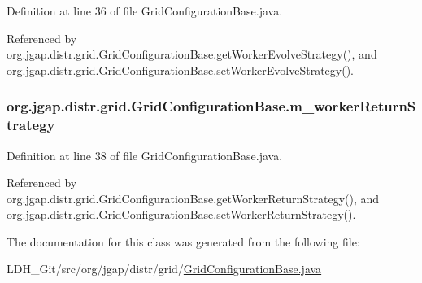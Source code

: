 Definition at line 36 of file Grid\-Configuration\-Base.\-java.



Referenced by org.\-jgap.\-distr.\-grid.\-Grid\-Configuration\-Base.\-get\-Worker\-Evolve\-Strategy(), and org.\-jgap.\-distr.\-grid.\-Grid\-Configuration\-Base.\-set\-Worker\-Evolve\-Strategy().

\hypertarget{classorg_1_1jgap_1_1distr_1_1grid_1_1_grid_configuration_base_aa5e69435385d2d6922c5dc43283f776e}{
\subsubsection[{m\-\_\-worker\-Return\-Strategy}]{ org.\-jgap.\-distr.\-grid.\-Grid\-Configuration\-Base.\-m\-\_\-worker\-Return\-Strategy\hspace{0.3cm}{\ttfamily [private]}}}\label{classorg_1_1jgap_1_1distr_1_1grid_1_1_grid_configuration_base_aa5e69435385d2d6922c5dc43283f776e}


Definition at line 38 of file Grid\-Configuration\-Base.\-java.



Referenced by org.\-jgap.\-distr.\-grid.\-Grid\-Configuration\-Base.\-get\-Worker\-Return\-Strategy(), and org.\-jgap.\-distr.\-grid.\-Grid\-Configuration\-Base.\-set\-Worker\-Return\-Strategy().



The documentation for this class was generated from the following file\-:\begin{DoxyCompactItemize}
\item 
L\-D\-H\-\_\-\-Git/src/org/jgap/distr/grid/\hyperlink{_grid_configuration_base_8java}{Grid\-Configuration\-Base.\-java}\end{DoxyCompactItemize}
